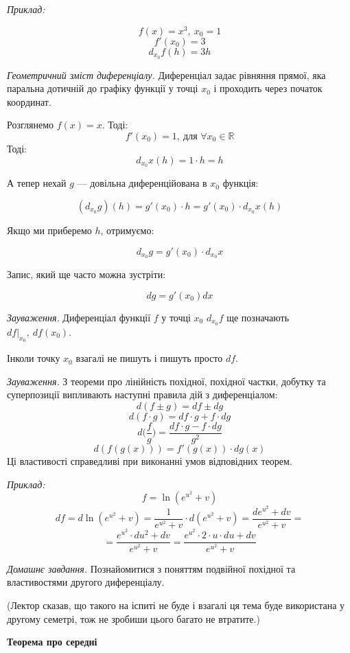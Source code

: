 \documentclass[12pt]{report}
\begin{document}
\textit{Приклад:}

$$f(x) = x^3,\ x_0 = 1$$
$$f'(x_0) = 3$$
$$d_{x_0}f(h) = 3h$$

\textit{Геометричний зміст диференціалу.} Диференціал задає рівняння прямої, яка паральна дотичній до графіку функції у точці $x_0$ і проходить через початок координат.

\vspace{5mm}

Розглянемо $f(x) = x$. Тоді:
$$f'(x_0) = 1,\ \textrm{для } \forall x_0 \in \mathbb{R}$$
Тоді:
$$d_{x_0}x(h) = 1 \cdot h = h$$

А тепер нехай $g$ --- довільна диференційована в $x_0$ функція:

$$(d_{x_0}g)(h) = g'(x_0) \cdot h = g'(x_0) \cdot d_{x_0} x(h)$$

Якщо ми приберемо $h$, отримуємо:

$$d_{x_0} g = g'(x_0) \cdot d_{x_0} x$$

Запис, який ще часто можна зустріти:

$$dg = g'(x_0)dx$$ 

\textit{Зауваження.} Диференціал функції $f$ у точці $x_0$ $d_{x_0} f$ ще позначають $df|_{x_0},\ df(x_0)$.

Інколи точку $x_0$ взагалі не пишуть і пишуть просто $df$.

\vspace{3mm}

\textit{Зауваження.} З теореми про лінійність похідної, похідної частки, добутку та суперпозиції випливають наступні правила дій з диференціалом:
$$d(f \pm g) = df \pm dg$$
$$d(f \cdot g) = df \cdot g + f \cdot dg$$
$$d\Big(\frac{f}{g}\Big) = \frac{df \cdot g - f \cdot dg}{g^2}$$
$$d(f(g(x))) = f'(g(x)) \cdot dg(x)$$
Ці властивості справедливі при виконанні умов відповідних теорем. 

\textit{Приклад:}
$$f = \ln (e^{u^2} + v)$$
$$df = d\ln (e^{u^2} + v) = \frac{1}{e^{u^2} + v} \cdot d(e^{u^2} + v) = \frac{d e^{u^2} + dv}{e^{u^2} + v} = $$
$$= \frac{e^{u^2} \cdot d u^2 + dv}{e^{u^2} + v} = \frac{e^{u^2} \cdot 2 \cdot u \cdot du + dv}{e^{u^2} + v}$$

\textit{Домашнє завдання.} Познайомитися з поняттям подвійної похідної та властивостями другого диференціалу. 

(Лектор сказав, що такого на іспиті не буде і взагалі ця тема буде використана у другому семетрі, тож не зробиши цього багато не втратите.)

\begin{center}
\textbf{\large Теорема про середні}
\end{center}
\end{document}
